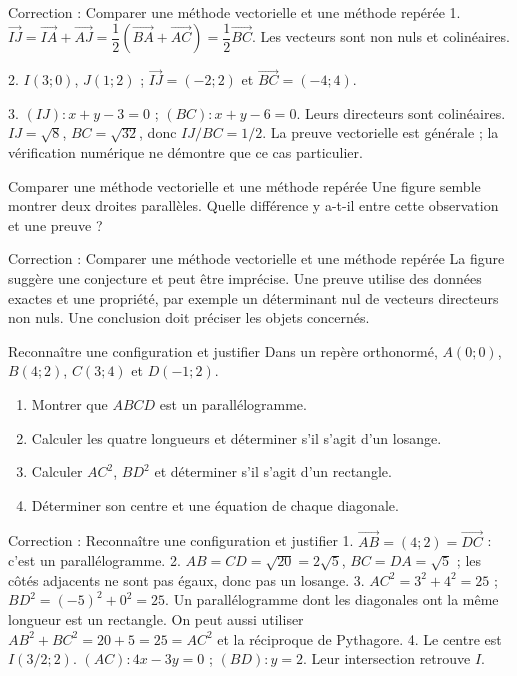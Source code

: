 \documentclass[aspectratio=169,10pt]{beamer}
\providecommand{\vect}[1]{\overrightarrow{#1}}
\begin{document}
\begin{frame}{Correction : Comparer une méthode vectorielle et une méthode repérée}
1. \(\vect{IJ}=\vect{IA}+\vect{AJ}=\dfrac12(\vect{BA}+\vect{AC})=\dfrac12\vect{BC}\). Les vecteurs sont non nuls et colinéaires.

2. \(I(3;0)\), \(J(1;2)\) ; \(\vect{IJ}=(-2;2)\) et \(\vect{BC}=(-4;4)\).

3. \((IJ):x+y-3=0\) ; \((BC):x+y-6=0\). Leurs directeurs sont colinéaires. \(IJ=\sqrt8\), \(BC=\sqrt{32}\), donc \(IJ/BC=1/2\). La preuve vectorielle est générale ; la vérification numérique ne démontre que ce cas particulier.
\end{frame}
\begin{frame}{Comparer une méthode vectorielle et une méthode repérée}
Une figure semble montrer deux droites parallèles. Quelle différence y a-t-il entre cette observation et une preuve ?
\end{frame}
\begin{frame}{Correction : Comparer une méthode vectorielle et une méthode repérée}
La figure suggère une conjecture et peut être imprécise. Une preuve utilise des données exactes et une propriété, par exemple un déterminant nul de vecteurs directeurs non nuls. Une conclusion doit préciser les objets concernés.
\end{frame}
\begin{frame}{Reconnaître une configuration et justifier}
Dans un repère orthonormé, \(A(0;0)\), \(B(4;2)\), \(C(3;4)\) et \(D(-1;2)\).

\begin{enumerate}
\setcounter{enumi}{0}\item Montrer que \(ABCD\) est un parallélogramme.
\item Calculer les quatre longueurs et déterminer s'il s'agit d'un losange.
\item Calculer \(AC^2\), \(BD^2\) et déterminer s'il s'agit d'un rectangle.
\item Déterminer son centre et une équation de chaque diagonale.

\end{enumerate}
\end{frame}
\begin{frame}{Correction : Reconnaître une configuration et justifier}
1. \(\vect{AB}=(4;2)=\vect{DC}\) : c'est un parallélogramme. 2. \(AB=CD=\sqrt{20}=2\sqrt5\), \(BC=DA=\sqrt5\) ; les côtés adjacents ne sont pas égaux, donc pas un losange. 3. \(AC^2=3^2+4^2=25\) ; \(BD^2=(-5)^2+0^2=25\). Un parallélogramme dont les diagonales ont la même longueur est un rectangle. On peut aussi utiliser \(AB^2+BC^2=20+5=25=AC^2\) et la réciproque de Pythagore. 4. Le centre est \(I(3/2;2)\). \((AC):4x-3y=0\) ; \((BD):y=2\). Leur intersection retrouve \(I\).
\end{frame}
\end{document}
